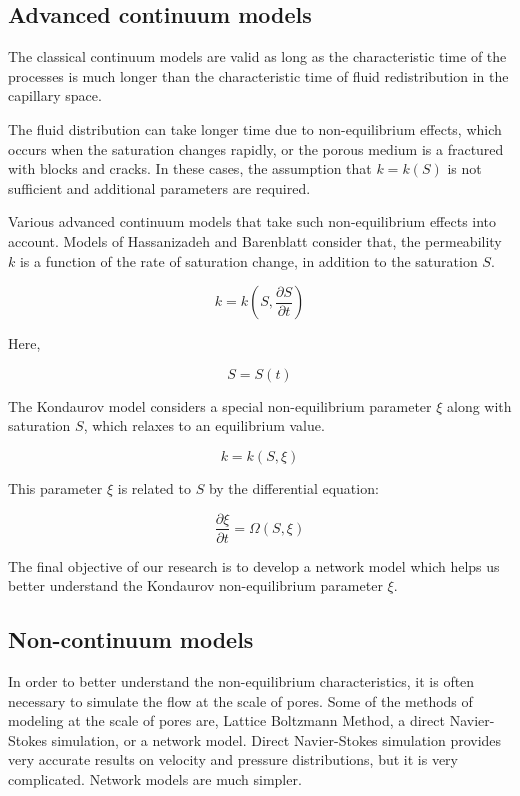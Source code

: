 \subsection{Advanced continuum models}
	The classical continuum models are valid as long as the characteristic time of the processes is much longer than the characteristic time of fluid redistribution in the capillary space.
	
	The fluid distribution can take longer time due to non-equilibrium effects, which occurs when the saturation changes rapidly, or the porous medium is a fractured with blocks and cracks. In these cases, the assumption that $k = k(S)$ is not sufficient and additional parameters are required.

	Various advanced continuum models that take such non-equilibrium effects into account. Models of Hassanizadeh \cite{hassanizadeh2004continuum} \cite{hassanizadeh1987high} and Barenblatt \cite{barenblatt1960basic} consider that, the permeability $k$ is a function of the rate of saturation change, in addition to the saturation $S$.                  
	
	\begin{equation}
		k = k(S, \frac{\partial S}{\partial t})
	\end{equation}
	
	Here,
	
	\begin{equation}
		S = S(t)
	\end{equation}
	
	The Kondaurov model \cite{kondaurov2009non} considers a special non-equilibrium parameter $\xi$ along with saturation $S$, which relaxes to an equilibrium value. \cite{kondaurov2007thermodynamically}
	
	\begin{equation}
		k = k(S, \xi)
	\end{equation}
	
	This parameter $\xi$ is related to $S$ by the differential equation:
	
	\begin{equation}
		\frac{\partial \xi}{\partial t} = \Omega ( S, \xi )
	\end{equation}
	
	The final objective of our research is to develop a network model which helps us better understand the Kondaurov non-equilibrium parameter $\xi$.
	 
\subsection{Non-continuum models}
	In order to better understand the non-equilibrium characteristics, it is often necessary to simulate the flow at the scale of pores. Some of the methods of modeling at the scale of pores are, Lattice Boltzmann Method, a direct Navier-Stokes simulation, or a network model. Direct Navier-Stokes simulation provides very accurate results on velocity and pressure distributions, but it is very complicated. Network models are much simpler.
	
